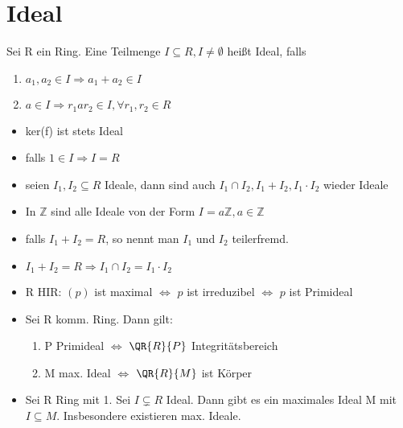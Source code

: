\section{Ideal}
\begin{definition}
Sei R ein Ring. Eine Teilmenge $I \subseteq R, I \neq \emptyset$ heißt Ideal, falls
\begin{enumerate}
	\item $a_1,a_2 \in I \Rightarrow a_1+a_2 \in I$
	\item $a \in I \Rightarrow r_1 a r_2 \in I, \forall r_1,r_2 \in R$
\end{enumerate}
\end{definition}
\begin{remark}
\begin{itemize}
	\item ker(f) ist stets Ideal
	\item falls $1 \in I \Rightarrow I = R$
	\item seien $I_1,I_2 \subseteq R$ Ideale, dann sind auch $I_1 \cap I_2, I_1+I_2, I_1 \cdot I_2$ wieder Ideale
	\item In $\mathbb{Z}$ sind alle Ideale von der Form $I=a\mathbb{Z}, a \in \mathbb{Z}$
	\item falls $I_1+I_2 = R$, so nennt man $I_1$ und $I_2$ teilerfremd.
	\item $I_1+I_2 = R \Rightarrow I_1 \cap I_2 = I_1 \cdot I_2$
	\item R HIR: $(p)$ ist maximal $ \Leftrightarrow $ $p$ ist irreduzibel $\Leftrightarrow$ $p$ ist Primideal
	\item Sei R komm. Ring. Dann gilt:
	\begin{enumerate}
		\item P Primideal $\Leftrightarrow$ $\QR{R}{P}$ Integritätsbereich
		\item M max. Ideal $\Leftrightarrow$ $\QR{R}{M}$ ist Körper
	\end{enumerate}
	\item Sei R Ring mit 1. Sei $I \subsetneq R $ Ideal. Dann gibt es ein maximales Ideal M mit $ I \subseteq M$. Insbesondere existieren max. Ideale.
\end{itemize}
\end{remark}
